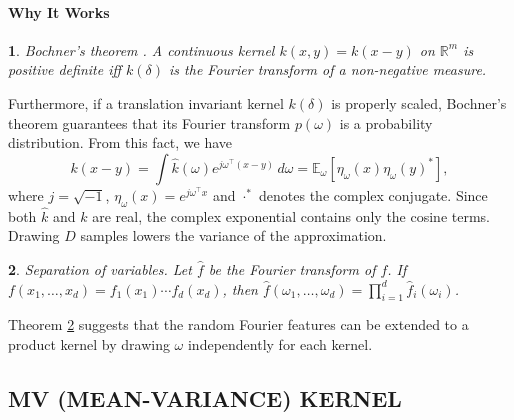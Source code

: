 \documentclass[english]{article}
\theoremstyle{plain}
\newtheorem{thm}{\protect\theoremname}
\theoremstyle{plain}
\providecommand{\theoremname}{Theorem}
\begin{document}
\paragraph{Why It Works }
\begin{thm}
Bochner's theorem . A continuous kernel $k(x,y)=k(x-y)$ on $\mathbb{R}^{m}$
is positive definite iff $k(\delta)$ is the Fourier transform of
a non-negative measure.
\end{thm}
%
Furthermore, if a translation invariant kernel $k(\delta)$ is properly
scaled, Bochner's theorem guarantees that its Fourier transform $p(\omega)$
is a  probability distribution. From this fact, we have 
\[
k(x-y)=\int\hat{k}(\omega)e^{j\omega^{\top}\left(x-y\right)}\, d\omega=\mathbb{E}_{\omega}\left[\eta_{\omega}(x)\eta_{\omega}(y)^{*}\right], 
\]
where $j=\sqrt{-1}$, $\eta_{\omega}(x)=e^{j\omega^{\top}x}$ and $\cdot^{*}$ denotes
the complex conjugate. Since both $\hat{k}$ and $k$ are real, the complex
exponential contains only the cosine terms. Drawing $D$ samples lowers the variance of the approximation.
%
\begin{thm}
\label{thm:Separation-of-variables.}Separation of variables. Let
$\hat{f}$ be the Fourier transform of $f$. If $f(x_{1},\ldots,x_{d})=f_{1}(x_{1})\cdots f_{d}(x_{d})$,
then $\hat{f}(\omega_{1},\ldots,\omega_{d})=\prod_{i=1}^{d}\hat{f}_{i}(\omega_{i})$. 
\end{thm}
Theorem \ref{thm:Separation-of-variables.} suggests that the random
Fourier features can be extended to a product kernel by drawing $\omega$
independently for each kernel. 

\subsection{MV (MEAN-VARIANCE) KERNEL }
\label{sec:mv_kernel}
\end{document}
